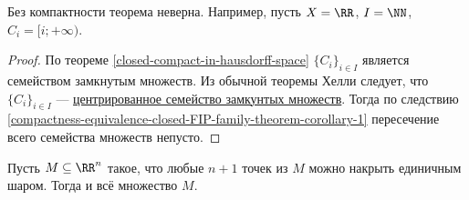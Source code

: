 \documentclass[12pt,a4paper]{article}
\begin{document}
    \begin{remark}
        Без компактности теорема неверна. Например, пусть $X = \RR$, $I = \NN$, $C_i = [i; +\infty)$.
    \end{remark}

    \begin{proof}
        По теореме \ref{closed-compact-in-hausdorff-space} $\{C_i\}_{i \in I}$ является семейством замкнутым множеств. Из обычной теоремы Хелли следует, что $\{C_i\}_{i \in I}$ --- \hyperref[finite-intersection-property-definition]{центрированное семейство замкунтых множеств}. Тогда по следствию \ref{compactness-equivalence-closed-FIP-family-theorem-corollary-1} пересечение всего семейства множеств непусто.
    \end{proof}

    \begin{corollary}
        Пусть $M \subseteq \RR^n$ такое, что любые $n+1$ точек из $M$ можно накрыть единичным шаром. Тогда и всё множество $M$.
    \end{corollary}
\end{document}
